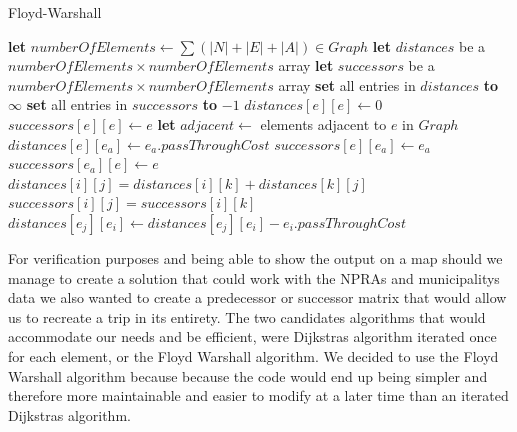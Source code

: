 \begin{algorithm}[thbp]
\caption{Floyd-Warshall}\label{floyd-warshall-pseudocode}
\begin{algorithmic}[1]

	\State \textbf{let} $numberOfElements \leftarrow \sum (|N|+|E|+|A|) \in Graph$
	\State \textbf{let} $distances$ be a $numberOfElements \times numberOfElements$ array
	\State \textbf{let} $successors$ be a $numberOfElements \times numberOfElements$ array
	\State \textbf{set} all entries in $distances$ \textbf{to} $\infty$
	\State \textbf{set} all entries in $successors$ \textbf{to} $-1$
	\Statex
		\State $distances[e][e] \leftarrow 0$
		\State $successors[e][e] \leftarrow e$
	\EndFor
	\Statex
		\State \textbf{let} $adjacent \leftarrow $ elements adjacent to $e$ in $Graph$
			\State $distances[e][e_a] \leftarrow e_a.passThroughCost$
			\State $successors[e][e_a] \leftarrow e_a$
			\State $successors[e_a][e] \leftarrow e$
		\EndFor
	\EndFor
	\Statex
					\State $distances[i][j] = distances[i][k] + distances[k][j]$
					\State $successors[i][j] = successors[i][k]$
				\EndIf
			\EndFor
		\EndFor
	\EndFor
	\Statex
			\State $distances[e_j][e_i] \leftarrow distances[e_j][e_i] - e_i.passThroughCost$
		\EndIf
	\EndFor
\EndProcedure

\end{algorithmic}
\end{algorithm}

For verification purposes and being able to show the output on a map should we manage to create a solution that could work with the NPRAs and municipalitys data we also wanted to create a predecessor or successor matrix that would allow us to recreate a trip in its entirety. The two candidates algorithms that would accommodate our needs and be efficient, were Dijkstras algorithm iterated once for each element, or the Floyd Warshall algorithm. We decided to use the Floyd Warshall algorithm because because the code would end up being simpler and therefore more maintainable and easier to modify at a later time than an iterated Dijkstras algorithm.

